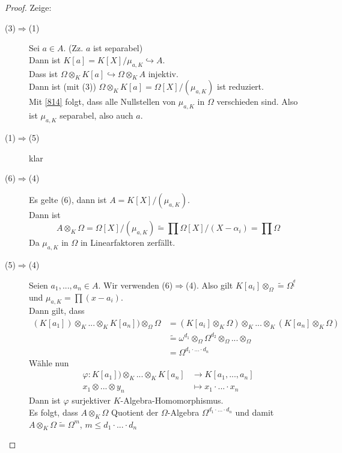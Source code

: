 \documentclass[10pt,a4paper]{article}
\newcommand{\al}{\ensuremath{\alpha}}
\newcommand{\isomorph}{\ensuremath{\tilde{=}}}
\theoremstyle{definition}
\theoremstyle{plain}
\theoremstyle{remark}
\begin{document}
\begin{proof}
	Zeige:\\
	\begin{center}
	\end{center}

	\begin{description}
		\item[(3)$\Rightarrow$(1)] Sei $a\in A$. (Zz. $a$ ist separabel)\\
		Dann ist $K[a]=K[X]/\mu_{a,K}\hookrightarrow A$.\\
		Dass ist $\Omega\otimes_K K[a]\hookrightarrow \Omega\otimes_K A$ injektiv.\\
		Dann ist (mit (3)) $\Omega\otimes_K K[a]=\Omega[X]/(\mu_{a,K})$ ist reduziert.\\
		Mit \ref{814} folgt, dass alle Nullstellen von $\mu_{a,K}$ in $\Omega$ verschieden sind. Also ist $\mu_{a,K}$ separabel, also auch $a$.
		\item[(1)$\Rightarrow$(5)] klar
		\item[(6)$\Rightarrow$(4)] Es gelte (6), dann ist $A=K[X]/(\mu_{a,K})$.\\
		Dann ist 
		\[A\otimes_K\Omega=\Omega[X]/(\mu_{a,K})\isomorph\prod \Omega[X]/(X-\al_i)=\prod\Omega\]
		Da $\mu_{a,K}$ in $\Omega$ in Linearfaktoren zerfällt.
		\item[(5)$\Rightarrow$(4)] Seien $a_1,...,a_n\in A$. Wir verwenden (6)$\Rightarrow$(4). Also gilt $K[a_i]\otimes_\Omega\isomorph \Omega^{^d_i}$ und $\mu_{a,K}=\prod (x-a_i)$.\\
		Dann gilt, dass
		\begin{align*}
		(K[a_1])\otimes_K...\otimes_K K[a_n])\otimes_\Omega \Omega &=(K[a_i]\otimes_K\Omega)\otimes_K...\otimes_K(K[a_n]\otimes_K\Omega)\\
		&\isomorph\omega^{d_1}\otimes_\Omega \Omega^{d_2}\otimes_\Omega...\otimes_\Omega\\
		&=\Omega^{d_1\cdot...\cdot d_n}
		\end{align*}
		Wähle nun
		\begin{align*}
		\varphi:K[a_1])\otimes_K...\otimes_K K[a_n]&\to K[a_1,...,a_n]\\
		x_1\otimes...\otimes y_n&\mapsto x_1\cdot...\cdot x_n
		\end{align*}
		Dann ist $\varphi$ surjektiver $K$-Algebra-Homomorphismus.\\
		Es folgt, dass $A\otimes_K\Omega$ Quotient der $\Omega$-Algebra $\Omega^{d_1\cdot...\cdot d_n}$ und damit $A\otimes_K\Omega\isomorph \Omega^m$, $m\leq d_1\cdot...\cdot d_n$
	\end{description}
\end{proof}
\end{document}
